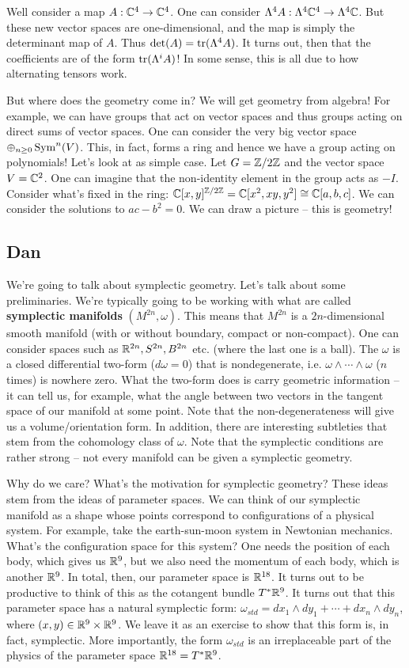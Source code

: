 \documentclass{../mathnotes}
\begin{document}
Well consider a map $A:\mathbb{C}^4\to\mathbb{C}^4$. One can consider $\Lambda^4 A:\Lambda^4\mathbb{C}^4\to\Lambda^4\mathbb{C}$. But these new vector spaces
are one-dimensional, and the map is simply the determinant map of $A$. Thus $\det(A)=\operatorname{tr}(\Lambda^4A)$. It turns out, then that
the coefficients are of the form $\operatorname{tr}(\Lambda^iA)$! In some sense, this is all due to how alternating tensors work.

But where does the geometry come in? We will get geometry from algebra! For example, we can have groups that act on vector spaces and
thus groups acting on direct sums of vector spaces. One can consider the very big vector space $\oplus_{n\geq 0}\operatorname{Sym}^n(V)$. This, in fact,
forms a ring and hence we have a group acting on polynomials! Let's look at as simple case.
Let $G=\mathbb{Z}/2\mathbb{Z}$ and the vector space $V=\mathbb{C}^2$. One can imagine that the non-identity element in the group acts as $-I$. Consider
what's fixed in the ring: $\mathbb{C}[x,y]^{\mathbb{Z}/2\mathbb{Z}}=\mathbb{C}[x^2,xy,y^2]\cong \mathbb{C}[a,b,c]$. We can consider the solutions to $ac-b^2=0$. We can draw a picture -- this is geometry!

\subsection{Dan}

We're going to talk about symplectic geometry. Let's talk about some preliminaries. We're typically going to be working with what are called \textbf{symplectic
manifolds} $(M^{2n},\omega)$. This means that $M^{2n}$ is a $2n$-dimensional smooth manifold (with or without boundary, compact or non-compact).
One can consider spaces such as $\mathbb{R}^{2n},S^{2n},B^{2n}$ etc. (where the last one is a ball). The $\omega$ is a closed differential two-form ($d\omega=0$) that
is nondegenerate, i.e. $\omega\wedge\cdots\wedge\omega$ ($n$ times) is nowhere zero. What the two-form does is carry geometric information -- it can tell us,
for example, what the angle between two vectors in the tangent space of our manifold at some point. Note that the non-degenerateness will give us a
volume/orientation form. In addition, there are interesting subtleties that stem from the cohomology class of $\omega$. Note that the symplectic conditions
are rather strong -- not every manifold can be given a symplectic geometry.

Why do we care? What's the motivation for symplectic geometry? These ideas stem from the ideas of parameter spaces. We can think of our symplectic manifold
as a shape whose points correspond to configurations of a physical system. For example, take the earth-sun-moon system in Newtonian mechanics.
What's the configuration space for this system? One needs the position of each body, which gives us $\mathbb{R}^9$, but we also need the momentum of each body, which is
another $\mathbb{R}^9$. In total, then, our parameter space is $\mathbb{R}^{18}$. It turns out to be productive to think of this as the cotangent bundle $T^*\mathbb{R}^9$.
It turns out that this parameter space has a natural symplectic form: $\omega_{std}=dx_1\wedge dy_1+\cdots+dx_n\wedge dy_n$, where $(x,y)\in\mathbb{R}^9\times\mathbb{R}^9$.
We leave it as an exercise to show that this form is, in fact, symplectic. More importantly, the form $\omega_{std}$ is an irreplaceable part of the physics
of the parameter space $\mathbb{R}^{18}=T^*\mathbb{R}^9$.
\end{document}
